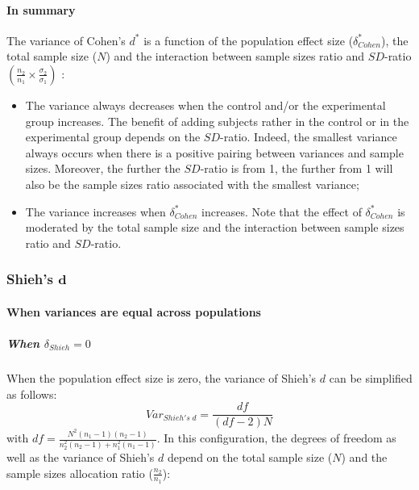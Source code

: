 \documentclass[
  english,
  man,mask,floatsintext]{apa6}
\providecommand{\tightlist}{%
  \setlength{\itemsep}{0pt}\setlength{\parskip}{0pt}}
\let\oldparagraph\paragraph
\renewcommand{\paragraph}[1]{\oldparagraph{#1}\mbox{}}
\let\oldsubparagraph\subparagraph
\renewcommand{\subparagraph}[1]{\oldsubparagraph{#1}\mbox{}}
\begin{document}
\hypertarget{in-summary-3}{%
\paragraph{In summary}\label{in-summary-3}}

The variance of Cohen's \(d^*\) is a function of the population effect size (\(\delta^*_{Cohen}\)), the total sample size (\(N\)) and the interaction between sample sizes ratio and \(SD\)-ratio \(\left(\frac{n_2}{n_1}\times\frac{\sigma_2}{\sigma_1} \right)\) :

\begin{itemize}
\tightlist
\item
  The variance always decreases when the control and/or the experimental group increases. The benefit of adding subjects rather in the control or in the experimental group depends on the \(SD\)-ratio. Indeed, the smallest variance always occurs when there is a positive pairing between variances and sample sizes. Moreover, the further the \(SD\)-ratio is from 1, the further from 1 will also be the sample sizes ratio associated with the smallest variance;\\
\item
  The variance increases when \(\delta^*_{Cohen}\) increases. Note that the effect of \(\delta^*_{Cohen}\) is moderated by the total sample size and the interaction between sample sizes ratio and \(SD\)-ratio.
\end{itemize}

\hypertarget{shiehs-bmd}{%
\subsubsection{\texorpdfstring{Shieh's \(\bm{d}\)}{Shieh's \textbackslash bm\{d\}}}\label{shiehs-bmd}}

\hypertarget{when-variances-are-equal-across-populations-5}{%
\paragraph{When variances are equal across populations}\label{when-variances-are-equal-across-populations-5}}

\hypertarget{when-delta_shieh-0}{%
\subparagraph{\texorpdfstring{When \(\delta_{Shieh} = 0\)}{When \textbackslash delta\_\{Shieh\} = 0}}\label{when-delta_shieh-0}}

When the population effect size is zero, the variance of Shieh's \(d\) can be simplified as follows:
\[Var_{Shieh's \; d} = \frac{df}{(df-2)N}\]
with \(df = \frac{N^2(n_1-1)(n_2-1)}{n_2^2(n_2-1)+n_1^2(n_1-1)}\). In this configuration, the degrees of freedom as well as the variance of Shieh's \(d\) depend on the total sample size (\(N\)) and the sample sizes allocation ratio (\(\frac{n_2}{n_1}\)):
\end{document}
